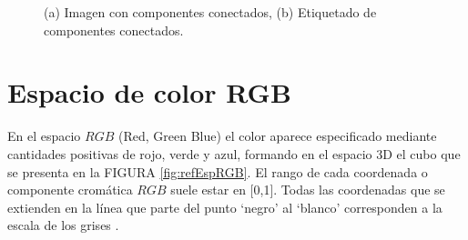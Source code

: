   \begin{figure}[H]
	\centering
		\caption{(a) Imagen con componentes conectados, (b) Etiquetado de componentes conectados.}
	\label{fig:ejemploVecindad}
\end{figure}

  
 

\section{Espacio de color RGB}



En el espacio $RGB$ (Red, Green Blue) el color aparece especificado mediante cantidades positivas de rojo, verde y azul, formando en el espacio 3D el cubo que se presenta en la FIGURA \ref{fig:refEspRGB}. El rango de cada coordenada o componente cromática $RGB$ suele estar en [0,1]. %
Todas las coordenadas que se extienden en la línea que parte del punto ‘negro’ al ‘blanco’ corresponden a la escala de los grises \cite{ortiz2002procesamiento}. 

